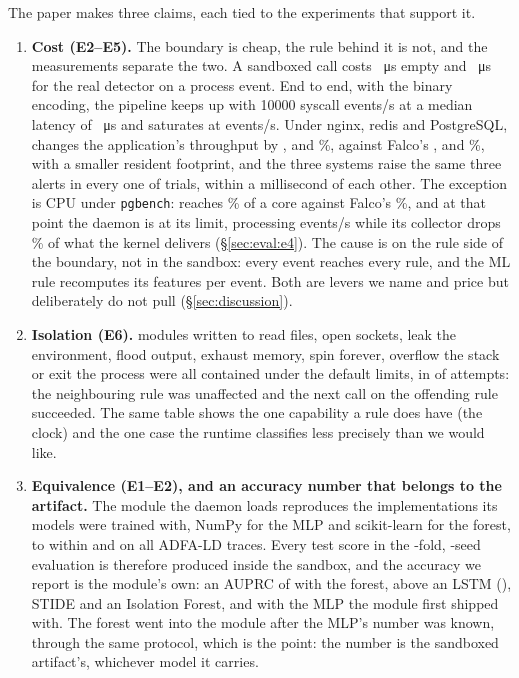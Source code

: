 The paper makes three claims, each tied to the experiments that support
it.

\begin{enumerate}
\item \textbf{Cost (E2--E5).} The boundary is cheap, the rule behind it is
  not, and the measurements separate the two. A sandboxed call costs
  \eTwoEngineOverheadUs{}~\si{\micro\second} empty and
  \eTwoMlRawUs{}~\si{\micro\second} for the real detector on a process
  event. End to end, with the binary encoding, the pipeline keeps up with
  \num{10000} syscall events/s at a median latency of
  \eThreePFiftyBinTenKRf{}~\si{\micro\second} and saturates at
  \eThreeAchievedBinFiftyKRf{} events/s. Under nginx, redis and
  PostgreSQL, \sys changes the application's throughput by
  \eFourDeltaNginxWs{}, \eFourDeltaRedisWs{} and \eFourDeltaPgWs{}\%,
  against Falco's \eFourDeltaNginxFalco{}, \eFourDeltaRedisFalco{} and
  \eFourDeltaPgFalco{}\%, with a smaller resident footprint, and the three
  systems raise the same three alerts in every one of \eFiveTrials{}
  trials, within a millisecond of each other. The exception is CPU under
  \texttt{pgbench}: \sys reaches \eFourCpuPgWs{}\% of a core against
  Falco's \eFourCpuPgFalco{}\%, and at that point the daemon is at its
  limit, processing \eFourWsEpsPg{} events/s while its collector drops
  \eFourWsDroppedPctPg{}\% of what the kernel delivers
  (\S\ref{sec:eval:e4}). The cause is on the rule side of the boundary,
  not in the sandbox: every event reaches every rule, and the ML rule
  recomputes its features per event. Both are levers we name and price
  but deliberately do not pull (\S\ref{sec:discussion}).
\item \textbf{Isolation (E6).} \isoModules{} modules written to read
  files, open sockets, leak the environment, flood output, exhaust
  memory, spin forever, overflow the stack or exit the process were all
  contained under the default limits, in \isoContained{} of \isoTotal{}
  attempts: the neighbouring rule was unaffected and the next call on the
  offending rule succeeded. The same table shows the one capability a
  rule does have (the clock) and the one case the runtime classifies
  less precisely than we would like.
\item \textbf{Equivalence (E1--E2), and an accuracy number that belongs
  to the artifact.} The module the daemon loads reproduces the
  implementations its models were trained with, NumPy for the MLP and
  scikit-learn for the forest, to within \eTwoMaxDiffNumpyWasm{} and
  \eOneWasmSklearnMaxDiff{} on all \eTwoTraces{} ADFA-LD traces. Every
  test score in the \eOneFolds{}-fold, \eOneSeeds{}-seed evaluation is
  therefore produced inside the sandbox, and the accuracy we report is
  the module's own: an AUPRC of \eOneAuprcRfWasm{} with the forest, above
  an LSTM (\eOneAuprcLstm{}), STIDE and an Isolation Forest, and
  \eOneAuprcMlp{} with the MLP the module first shipped with. The forest
  went into the module after the MLP's number was known, through the same
  protocol, which is the point: the number is the sandboxed artifact's,
  whichever model it carries.
\end{enumerate}

